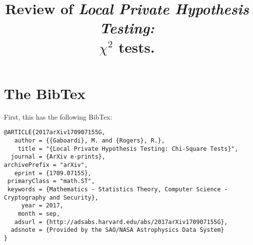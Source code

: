 \documentclass{article}
\begin{document}
\title{Review of \emph{Local Private Hypothesis Testing:}\\ $\chi^2$ tests.}
\maketitle
\section{The BibTex}
First, this has the following BibTex:
\begin{lstlisting}
@ARTICLE{2017arXiv170907155G,
   author = {{Gaboardi}, M. and {Rogers}, R.},
    title = "{Local Private Hypothesis Testing: Chi-Square Tests}",
  journal = {ArXiv e-prints},
archivePrefix = "arXiv",
   eprint = {1709.07155},
 primaryClass = "math.ST",
 keywords = {Mathematics - Statistics Theory, Computer Science - Cryptography and Security},
     year = 2017,
    month = sep,
   adsurl = {http://adsabs.harvard.edu/abs/2017arXiv170907155G},
  adsnote = {Provided by the SAO/NASA Astrophysics Data System}
}
\end{lstlisting}
\end{document}
